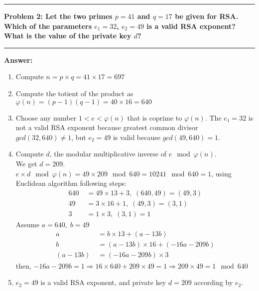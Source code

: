 \documentclass[11pt]{article}
\newcommand\question[2]{\vspace{.25in}\hrule\textbf{#1: #2}\vspace{.5em}\hrule\vspace{.10in}}
\renewcommand\part[1]{\vspace{.10in}\textbf{#1}}
\begin{document}

\question{Problem 2}{Let the two primes $p=41$ and $q =17$ be given for RSA. Which of the parameters $e_1=32$, $e_2=49$ is a valid RSA exponent? What is the value of the private key $d$?}

\part{Answer:}

\begin{enumerate}
	\item 
		Compute $n = p \times q = 41 \times 17 = 697$
	\item 
		Compute the totient of the product as $\varphi(n) = (p-1)(q-1) = 40 \times 16 = 640$
	\item 
		Choose any number $ 1 < e < \varphi(n)$ that is coprime to $\varphi(n)$. The $e_1=32$ is not a valid RSA exponent because greatest common divisor $\mathit{gcd}(32, 640) \neq 1$, but $e_2=49$ is valid because $\mathit{gcd}(49, 640) = 1$.
	\item
		Compute $d$, the modular multiplicative inverse of $e \mod \varphi(n)$. \\
		We get $d=209$. \\
		$e \times d \mod \varphi(n) = 49 \times 209 \mod 640 = 10241 \mod 640 = 1$, using Euclidean algorithm following steps:
		\begin{equation} \label{eq3}
		\begin{split}
			640 \; & = 49 \times 13 + 3, \; (640, 49) = (49, 3) \\
			49  \; & = 3 \times 16 + 1, \; (49, 3) = (3, 1) \\
			3   \; & = 1 \times 3, \; (3, 1) = 1 
		\end{split}
		\end{equation}
		Assume $a = 640, \; b = 49$
		\begin{equation} \label{eq3}
		\begin{split}
			a \; & = b \times 13 + (a - 13 b)\\
			b \; & = (a - 13 b) \times 16 + (-16 a - 209 b)\\
			(a - 13 b) \; & = (-16 a - 209 b) \times 3
		\end{split}
		\end{equation}
		then, $-16a - 209b = 1 \Rightarrow 16 \times 640 + 209 \times 49 = 1 \Rightarrow 209 \times 49 = 1\mod 640$
	\item
		$e_2 = 49$ is a valid RSA exponent, and private key $d = 209$ according by $e_2$.
\end{enumerate}
\end{document}
